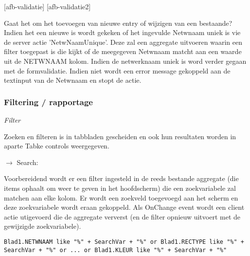[afb-validatie]
[afb-validatie2]

Gaat het om het toevoegen van nieuwe entry of wijzigen van een bestaande? Indien het een nieuwe is wordt gekeken of het ingevulde Netwnaam uniek is vie de server actie 'NetwNaamUnique'. Deze zal een aggregate uitvoeren waarin een filter toegepast is  die kijkt of de meegegeven Netwnaam matcht aan een waarde uit de NETWNAAM kolom. Indien de netwerknaam uniek is word verder gegaan met de formvalidatie. Indien niet wordt een error message gekoppeld aan de textinput van de Netwnaam en stopt de actie.

\subsubsection{Filtering / rapportage}

\textit{Filter}

Zoeken en filteren is in tabbladen gescheiden en ook hun resultaten worden in aparte Tabke controls weergegeven.

$\rightarrow$ Search:

Voorbereidend wordt er een filter ingesteld in de reeds bestande aggregate (die items ophaalt om weer te geven in het hoofdscherm) die een zoekvariabele zal matchen aan elke kolom.
Er wordt een zoekveld toegevoegd aan het scherm en deze zoekvariabele wordt eraan gekoppeld. Als OnChange event wordt een client actie utigevoerd die de aggregate ververst (en de filter opnieuw uitvoert met de gewijzigde zoekvariabele).

\begin{lstlisting}
Blad1.NETWNAAM like "%" + SearchVar + "%" or Blad1.RECTYPE like "%" + SearchVar + "%" or ... or Blad1.KLEUR like "%" + SearchVar + "%"
\end{lstlisting}

